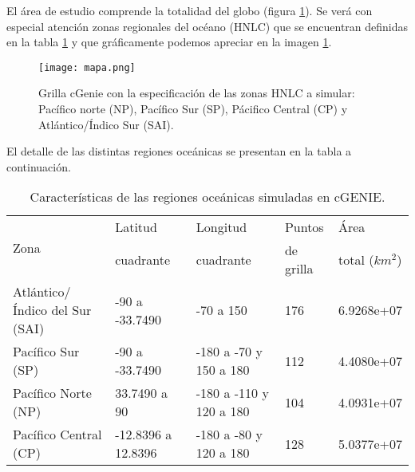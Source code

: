 
El \'area de estudio comprende la totalidad del globo (figura \ref{fig:Grilla4}). Se ver\'a con especial atenci\'on zonas regionales del oc\'eano (HNLC) que se encuentran definidas en la tabla \ref{tabla:Area1} y que gr\'aficamente podemos apreciar en la imagen
\ref{fig:Grilla4}. 

\begin{figure}[H]
\centering
  \texttt{[image: mapa.png]}
  \caption[Grilla global y regional de campos de flujo de polvo]{Grilla cGenie con la especificaci\'on de las zonas HNLC a simular: Pac\'ifico norte (NP), Pac\'ifico Sur (SP), P\'acifico Central (CP) y Atl\'antico/Índico Sur (SAI).}
  \label{fig:Grilla4}
\end{figure} 

El detalle de las distintas regiones oce\'anicas se presentan en la tabla a continuaci\'on. \newpage

\begin{table}[H]
\begin{center}
\begin{tabular}{l|l|l|l|l}
\hline
\multirow{2}{1cm}{ Zona}& Latitud & Longitud &Puntos & \'Area \\
 & cuadrante & cuadrante & de grilla & total  ($km^{2}$)\\
\hline \hline
Atlántico/Índico del Sur (SAI)& -90 a -33.7490 & -70 a 150 & 176&  6.9268e+07 \\ \hline
Pac\'ifico Sur (SP) & -90 a -33.7490 & -180 a -70 y 150 a 180& 112 & 4.4080e+07  \\ \hline
Pac\'ifico Norte (NP) & 33.7490 a 90 &  -180 a -110 y 120 a 180 & 104 & 4.0931e+07\\ \hline
Pac\'ifico Central (CP) & -12.8396 a 12.8396 & -180 a -80 y 120 a 180 & 128 & 5.0377e+07 \\ \hline
\end{tabular}
\caption{Caracter\'isticas de las regiones oce\'anicas simuladas en cGENIE.}
\label{tabla:Area1}
\end{center}
\end{table}
